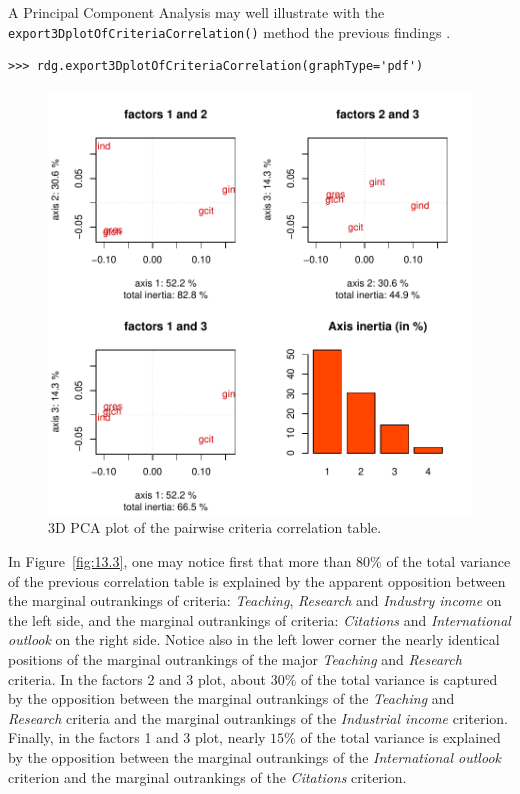 A Principal Component Analysis may well illustrate with the \texttt{export3Dplot\-OfCriteriaCorrelation()} method the previous findings \citep[Lecture 2]{CPSTAT-2020}. 
\begin{lstlisting}
>>> rdg.export3DplotOfCriteriaCorrelation(graphType='pdf')
\end{lstlisting}
\begin{figure}[ht]
\includegraphics[width=\hsize]{Figures/13-3-3DCorrelation.pdf}
\caption{3D PCA plot of the pairwise criteria correlation table.}
\label{fig:13.3}       %
\end{figure}

In Figure~\vref{fig:13.3}, one may notice first that more than $80\%$ of the total variance of the previous correlation table is explained by the apparent opposition between the marginal outrankings of criteria: \emph{Teaching}, \emph{Research} and \emph{Industry income} on the left side, and the marginal outrankings of criteria: \emph{Citations} and \emph{International outlook} on the right side. Notice also in the left lower corner the nearly identical positions of the marginal outrankings of the major \emph{Teaching} and \emph{Research} criteria. In the factors 2 and 3 plot, about $30\%$ of the total variance is captured by the opposition between the marginal outrankings of the \emph{Teaching} and \emph{Research} criteria and the marginal outrankings of the \emph{Industrial income} criterion. Finally, in the factors 1 and 3 plot, nearly $15\%$ of the total variance is explained by the opposition between the marginal outrankings of the \emph{International outlook} criterion and the marginal outrankings of the \emph{Citations} criterion.


